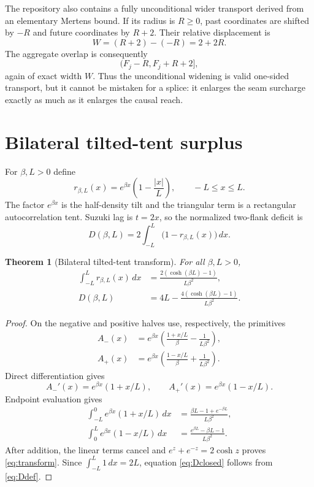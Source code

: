 \documentclass[11pt]{article}
\newtheorem{theorem}{Theorem}[section]
\newcommand{\Ioc}[2]{(#1,#2]}
\begin{document}
The repository also contains a fully unconditional wider transport derived from an elementary
Mertens bound.  If its radius is $R\ge0$, past coordinates are shifted by $-R$ and future
coordinates by $R+2$.  Their relative displacement is
\begin{equation}\label{eq:wide-width}
 W=(R+2)-(-R)=2+2R.
\end{equation}
The aggregate overlap is consequently
\[
 \Ioc{F_j-R}{F_j+R+2},
\]
again of exact width $W$.  Thus the unconditional widening is valid one-sided transport, but it
cannot be mistaken for a splice: it enlarges the seam surcharge exactly as much as it enlarges the
causal reach.

\section{Bilateral tilted-tent surplus}

For $\beta,L>0$ define
\[
 r_{\beta,L}(x)=e^{\beta x}\left(1-\frac{|x|}{L}\right),
 \qquad -L\le x\le L.
\]
The factor $e^{\beta x}$ is the half-density tilt and the triangular term is a rectangular
autocorrelation tent.  Suzuki lag is $t=2x$, so the normalized two-flank deficit is
\begin{equation}\label{eq:Ddef}
 D(\beta,L)=2\int_{-L}^L\bigl(1-r_{\beta,L}(x)\bigr)\,dx.
\end{equation}

\begin{theorem}[Bilateral tilted-tent transform]\label{thm:transform}
For all $\beta,L>0$,
\begin{align}
 \int_{-L}^L r_{\beta,L}(x)\,dx
 &=\frac{2(\cosh(\beta L)-1)}{L\beta^2},\label{eq:transform}\\
 D(\beta,L)
 &=4L-\frac{4(\cosh(\beta L)-1)}{L\beta^2}.\label{eq:Dclosed}
\end{align}
\end{theorem}

\begin{proof}
On the negative and positive halves use, respectively, the primitives
\begin{align*}
 A_-(x)&=e^{\beta x}\left(\frac{1+x/L}{\beta}
                  -\frac{1}{L\beta^2}\right),\\
 A_+(x)&=e^{\beta x}\left(\frac{1-x/L}{\beta}
                  +\frac{1}{L\beta^2}\right).
\end{align*}
Direct differentiation gives
\[
 A_-'(x)=e^{\beta x}(1+x/L),\qquad
 A_+'(x)=e^{\beta x}(1-x/L).
\]
Endpoint evaluation gives
\begin{align*}
 \int_{-L}^0e^{\beta x}(1+x/L)\,dx
 &=\frac{\beta L-1+e^{-\beta L}}{L\beta^2},\\
 \int_0^Le^{\beta x}(1-x/L)\,dx
 &=\frac{e^{\beta L}-\beta L-1}{L\beta^2}.
\end{align*}
After addition, the linear terms cancel and
$e^z+e^{-z}=2\cosh z$ proves \eqref{eq:transform}.  Since
$\int_{-L}^L1\,dx=2L$, equation \eqref{eq:Dclosed} follows from \eqref{eq:Ddef}.
\end{proof}
\end{document}
